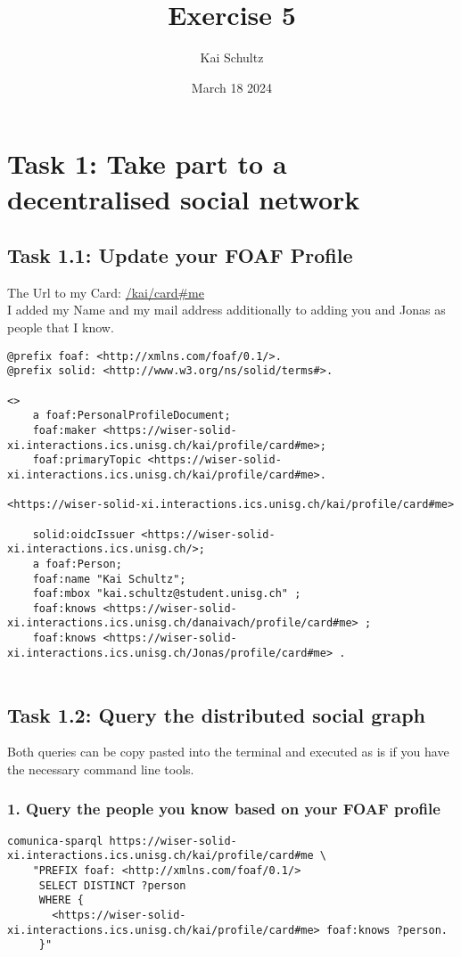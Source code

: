 \documentclass[11pt]{article}
\title{Exercise 5}
\author{Kai Schultz}
\date{March 18 2024} %
\begin{document}
\maketitle

\section*{Task 1: Take part to a decentralised social network}
\subsection*{Task 1.1: Update your FOAF Profile}
The Url to my Card: \href{https://wiser-solid-xi.interactions.ics.unisg.ch/kai/profile/card#me}{/kai/card\#me} \\
I added my Name and my mail address additionally to adding you and Jonas as people that I know.
\begin{lstlisting}
@prefix foaf: <http://xmlns.com/foaf/0.1/>.
@prefix solid: <http://www.w3.org/ns/solid/terms#>.

<>
    a foaf:PersonalProfileDocument;
    foaf:maker <https://wiser-solid-xi.interactions.ics.unisg.ch/kai/profile/card#me>;
    foaf:primaryTopic <https://wiser-solid-xi.interactions.ics.unisg.ch/kai/profile/card#me>.

<https://wiser-solid-xi.interactions.ics.unisg.ch/kai/profile/card#me>
    
    solid:oidcIssuer <https://wiser-solid-xi.interactions.ics.unisg.ch/>;
    a foaf:Person;
    foaf:name "Kai Schultz";
    foaf:mbox "kai.schultz@student.unisg.ch" ;
    foaf:knows <https://wiser-solid-xi.interactions.ics.unisg.ch/danaivach/profile/card#me> ;
    foaf:knows <https://wiser-solid-xi.interactions.ics.unisg.ch/Jonas/profile/card#me> .
    
\end{lstlisting}

\subsection*{Task 1.2: Query the distributed social graph}
Both queries can be copy pasted into the terminal and executed as is if you have the necessary command line tools.
\subsubsection*{1. Query the people you know based on your FOAF profile}
\begin{lstlisting}
comunica-sparql https://wiser-solid-xi.interactions.ics.unisg.ch/kai/profile/card#me \
    "PREFIX foaf: <http://xmlns.com/foaf/0.1/>
     SELECT DISTINCT ?person
     WHERE {
       <https://wiser-solid-xi.interactions.ics.unisg.ch/kai/profile/card#me> foaf:knows ?person.
     }"    
\end{lstlisting}
\end{document}
